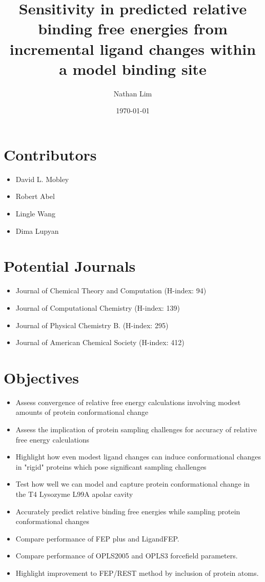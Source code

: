 \documentclass{article}
\begin{document}
\title{Sensitivity in predicted relative binding free energies from incremental ligand changes within a model binding site}
\date{\today}
\author{Nathan Lim}
\maketitle

\section*{Contributors}
\begin{itemize}
   \item David L. Mobley
   \item Robert Abel
   \item Lingle Wang
   \item Dima Lupyan
\end{itemize}

\section*{Potential Journals}
\begin{itemize}
   \item Journal of Chemical Theory and Computation (H-index: 94)
   \item Journal of Computational Chemistry (H-index: 139) 
   \item Journal of Physical Chemistry B. (H-index: 295)
   \item Journal of American Chemical Society (H-index: 412)
\end{itemize}

\section*{Objectives}
\begin{itemize}
   \item Assess convergence of relative free energy calculations involving modest amounts of protein conformational change
   \item Assess the implication of protein sampling challenges for accuracy of relative free energy calculations
   \item Highlight how even modest ligand changes can induce conformational changes in "rigid" proteins which pose significant sampling challenges
   \item Test how well we can model and capture protein conformational change in the T4 Lysozyme L99A apolar cavity
   \item Accurately predict relative binding free energies while sampling protein conformational changes
   \item Compare performance of FEP plus \cite{FEPplus} and LigandFEP.
   \item Compare performance of OPLS2005 and OPLS3 forcefield parameters.
   \item Highlight improvement to FEP/REST \cite{REST2} method by inclusion of protein atoms.
\end{itemize}
\end{document}
